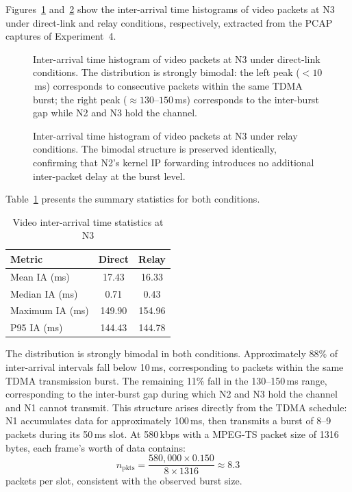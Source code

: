 Figures~\ref{fig:ia-direct} and~\ref{fig:ia-relay} show the inter-arrival
time histograms of video packets at N3 under direct-link and relay
conditions, respectively, extracted from the PCAP captures of Experiment~4.

\begin{figure}[H]
\centering
{}
\caption{Inter-arrival time histogram of video packets at N3 under
direct-link conditions. The distribution is strongly bimodal: the left
peak ($<10$\,ms) corresponds to consecutive packets within the same TDMA
burst; the right peak ($\approx 130$--$150$\,ms) corresponds to the
inter-burst gap while N2 and N3 hold the channel.}
\label{fig:ia-direct}
\end{figure}

\begin{figure}[H]
\centering
{}
\caption{Inter-arrival time histogram of video packets at N3 under relay
conditions. The bimodal structure is preserved identically, confirming
that N2's kernel IP forwarding introduces no additional inter-packet delay
at the burst level.}
\label{fig:ia-relay}
\end{figure}

Table~\ref{tab:ia} presents the summary statistics for both conditions.

\begin{table}[h]
\centering
\caption{Video inter-arrival time statistics at N3}
\label{tab:ia}
\begin{tabular}{lcc}
\toprule
\textbf{Metric} & \textbf{Direct} & \textbf{Relay} \\
\midrule
Mean IA (ms)    & 17.43  & 16.33  \\
Median IA (ms)  & 0.71   & 0.43   \\
Maximum IA (ms) & 149.90 & 154.96 \\
P95 IA (ms)     & 144.43 & 144.78 \\
\bottomrule
\end{tabular}
\end{table}

The distribution is strongly bimodal in both conditions. Approximately
88\% of inter-arrival intervals fall below 10\,ms, corresponding to
packets within the same TDMA transmission burst. The remaining 11\% fall
in the 130--150\,ms range, corresponding to the inter-burst gap during
which N2 and N3 hold the channel and N1 cannot transmit. This structure
arises directly from the TDMA schedule: N1 accumulates data for
approximately 100\,ms, then transmits a burst of 8--9 packets during its
50\,ms slot. At 580\,kbps with a MPEG-TS packet size of 1316 bytes,
each frame's worth of data contains:
\begin{equation}
n_{\mathrm{pkts}} = \frac{580{,}000 \times 0.150}{8 \times 1316} \approx 8.3
\label{eq:pkts-per-slot}
\end{equation}
packets per slot, consistent with the observed burst size.

